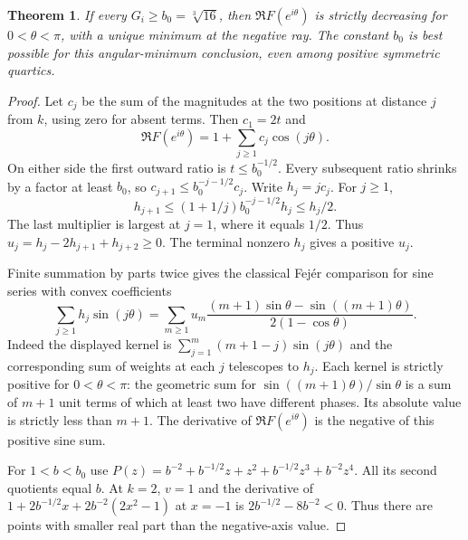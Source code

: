 \documentclass[11pt]{article}
\newtheorem{theorem}{Theorem}
\begin{document}
\begin{theorem}\label{min}
If every $G_i\ge b_0=\sqrt[3]{16}$, then $\Re F(e^{i\theta})$ is strictly decreasing for $0<\theta<\pi$, with a unique minimum at the negative ray. The constant $b_0$ is best possible for this angular-minimum conclusion, even among positive symmetric quartics.
\end{theorem}
\begin{proof}
Let $c_j$ be the sum of the magnitudes at the two positions at distance $j$ from $k$, using zero for absent terms. Then $c_1=2t$ and
\[
 \Re F(e^{i\theta})=1+\sum_{j\ge1}c_j\cos(j\theta).
\]
On either side the first outward ratio is $t\le b_0^{-1/2}$. Every subsequent ratio shrinks by a factor at least $b_0$, so $c_{j+1}\le b_0^{-j-1/2}c_j$. Write $h_j=jc_j$. For $j\ge1$,
\[
 h_{j+1}\le(1+1/j)b_0^{-j-1/2}h_j\le h_j/2.
\]
The last multiplier is largest at $j=1$, where it equals $1/2$. Thus $u_j=h_j-2h_{j+1}+h_{j+2}\ge0$. The terminal nonzero $h_j$ gives a positive $u_j$.

Finite summation by parts twice gives the classical Fej\'er comparison for sine series with convex coefficients~\cite{fejer}
\[
 \sum_{j\ge1}h_j\sin(j\theta)=
 \sum_{m\ge1} u_m
 \frac{(m+1)\sin\theta-\sin((m+1)\theta)}{2(1-\cos\theta)} .
\]
Indeed the displayed kernel is $\sum_{j=1}^m(m+1-j)\sin(j\theta)$ and the corresponding sum of weights at each $j$ telescopes to $h_j$. Each kernel is strictly positive for $0<\theta<\pi$: the geometric sum for $\sin((m+1)\theta)/\sin\theta$ is a sum of $m+1$ unit terms of which at least two have different phases. Its absolute value is strictly less than $m+1$. The derivative of $\Re F(e^{i\theta})$ is the negative of this positive sine sum.

For $1<b<b_0$ use $P(z)=b^{-2}+b^{-1/2}z+z^2+b^{-1/2}z^3+b^{-2}z^4$. All its second quotients equal $b$. At $k=2$, $v=1$ and the derivative of $1+2b^{-1/2}x+2b^{-2}(2x^2-1)$ at $x=-1$ is $2b^{-1/2}-8b^{-2}<0$. Thus there are points with smaller real part than the negative-axis value.
\end{proof}
\end{document}
